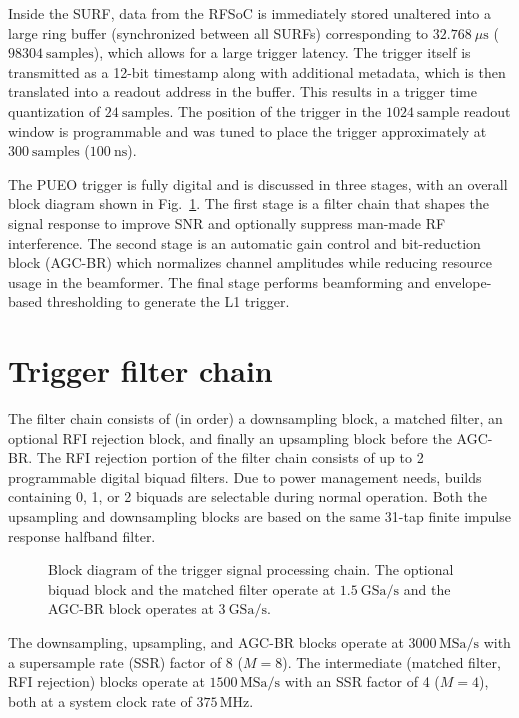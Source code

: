 \documentclass{IEEEtran}
\begin{document}
Inside the SURF, data from the RFSoC is immediately stored unaltered into a large ring
buffer (synchronized between all SURFs) corresponding to $32.768~\mu \textrm{s}$ 
($98304~\textrm{samples}$), which allows for a large trigger latency. The trigger
itself is transmitted as a 12-bit timestamp along with additional metadata, 
which is then translated into a readout address in the buffer. This results in a
trigger time quantization of $24~\textrm{samples}$. The position of the trigger in
the $1024~\textrm{sample}$ readout window is programmable and was tuned to place
the trigger approximately at $300~\textrm{samples}$ ($100~\textrm{ns}$).

The PUEO trigger is fully digital and is discussed in three stages, with an
overall block diagram shown in Fig.~\ref{fig:triggerfilterchain}. The first stage
is a filter chain that shapes the signal response to improve SNR and optionally 
suppress man-made RF interference. The second stage is an automatic
gain control and bit-reduction block (AGC-BR) which normalizes channel amplitudes
while reducing resource usage in the beamformer. The final stage performs beamforming
and envelope-based thresholding to generate the L1 trigger.

\section{Trigger filter chain}

The filter chain consists of (in order) a downsampling block, a matched filter,
an optional RFI rejection block, and finally an upsampling block before the
AGC-BR. The RFI rejection portion of the filter chain consists of up to 2
programmable digital biquad filters. Due to power management needs, builds
containing 0, 1, or 2 biquads are selectable during normal operation. Both
the upsampling and downsampling blocks are based on the same 31-tap finite
impulse response halfband filter.

\begin{figure}
\begin{center}
    
\end{center}
\caption{Block diagram of the trigger signal processing chain.
The optional biquad block and the matched filter operate at
$1.5~\textrm{GSa/s}$ and the AGC-BR block operates at
$3~\textrm{GSa/s}$.
}
\label{fig:triggerfilterchain}
\end{figure}


The downsampling, upsampling, and AGC-BR blocks operate at 
$3000\,\text{MSa/s}$ with a supersample rate (SSR) factor of 8 ($M=8$).
The intermediate (matched filter, RFI rejection) blocks operate at
$1500\,\text{MSa/s}$ with an SSR factor of 4 ($M=4$), both at a system
clock rate of $375\,\text{MHz}$.
\end{document}
